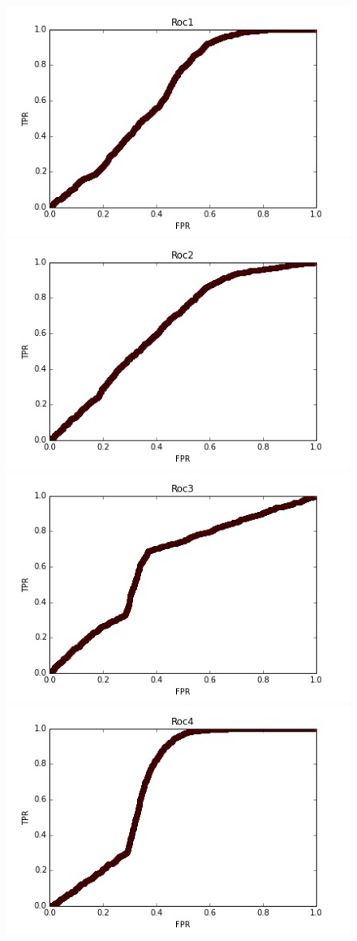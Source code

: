 \documentclass{article}
\begin{document}
\begin{figure}[H]
	\includegraphics[scale=0.58]{roc1.jpg}
	\includegraphics[scale=0.58]{roc2.jpg}\\
	\includegraphics[scale=0.58]{roc3.jpg}		\includegraphics[scale=0.58]{roc4.jpg}

\end{figure}
\end{document}
